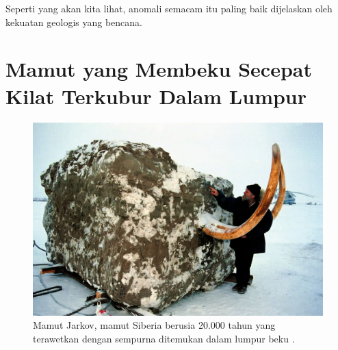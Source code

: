 \documentclass[10pt,twocolumn,letterpaper]{article}
\begin{document}
Seperti yang akan kita lihat, anomali semacam itu paling baik dijelaskan oleh kekuatan geologis yang bencana.

\section{Mamut yang Membeku Secepat Kilat Terkubur Dalam Lumpur}

\begin{figure}[t]
\begin{center}
   \includegraphics[width=1\linewidth]{jarkov-mammoth.jpg}
\end{center}
   \caption{Mamut Jarkov, mamut Siberia berusia 20.000 tahun yang terawetkan dengan sempurna ditemukan dalam lumpur beku \cite{51}.}
\label{fig:1}
\label{fig:onecol}
\end{figure}
\end{document}
